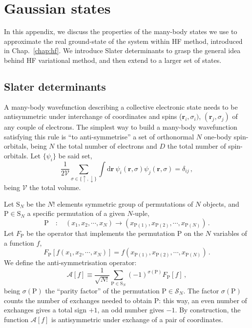 \chapter{Gaussian states}\label{app:slater-gaussian}

In this appendix, we discuss the properties of the many-body states we use to approximate the real ground-state of the system within HF method, introduced in Chap.~\ref{chap:hf}. We introduce Slater determinants to grasp the general idea behind HF variational method, and then extend to a larger set of states.

\section{Slater determinants}

A many-body wavefunction describing a collective electronic state needs to be antisymmetric under interchange of coordinates and spins ($\mathbf{r}_i,\sigma_i)$, $(\mathbf{r}_j,\sigma_j)$ of any couple of electrons. The simplest way to build a many-body wavefunction satisfying this rule is ``to anti-symmetrise'' a set of orthonormal $N$ one-body spin-orbitals, being $N$ the total number of electrons and $D$ the total number of spin-orbitals. Let $\lbrace \psi_i \rbrace$ be said set,
\[
	\frac{1}{2\mathcal{V}} \sum_{\sigma \in \lbrace \uparrow,\downarrow \rbrace} \int \mathrm{d}\mathbf{r}\ \psi_i(\mathbf{r},\sigma) \psi_j(\mathbf{r},\sigma) = \delta_{ij} \, ,
\]
being $\mathcal{V}$ the total volume. 

Let $\mathrm{S}_N$ be the $N!$ elements symmetric group of permutations of $N$ objects, and $\mathrm{P} \in \mathrm{S}_N$ a specific permutation of a given $N$-uple,
\[
	\mathrm{P}
	\quad\colon\quad
	(x_1, x_2, \cdots, x_N)
	\to
	\left(x_{\mathrm{P}(1)},x_{\mathrm{P}(2)},\cdots,x_{\mathrm{P}(N)}\right) \, .
\] 
Let $F_\mathrm{P}$ be the operator that implements the permutation $\mathrm{P}$ on the $N$ variables of a function $f$,
\[
	F_\mathrm{P} \left[ f (x_1, x_2, \cdots, x_N) \right] = f \left(x_{\mathrm{P}(1)},x_{\mathrm{P}(2)},\cdots,x_{\mathrm{P}(N)}\right) \, .
\]
We define the anti-symmetrisation operator:
\[
	\mathcal{A}[f] \equiv \frac{1}{\sqrt{N!}} \sum_{\mathrm{P}\in \mathrm{S}_N} (-1)^{\sigma(\mathrm{P})} F_\mathrm{P}[f] \, ,
\]
being $\sigma(\mathrm{P})$ the ``parity factor'' of the permutation $\mathrm{P} \in \mathcal{S}_N$. The factor $\sigma(\mathrm{P})$ counts the number of exchanges needed to obtain $\mathrm{P}$: this way, an even number of exchanges gives a total sign $+1$, an odd number gives $-1$. By construction, the function $\mathcal{A}[f]$ is antisymmetric under exchange of a pair of coordinates.

